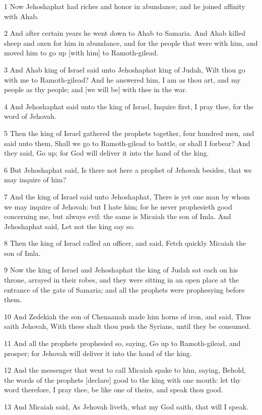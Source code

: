 \par 1 Now Jehoshaphat had riches and honor in abundance; and he joined affinity with Ahab.
\par 2 And after certain years he went down to Ahab to Samaria. And Ahab killed sheep and oxen for him in abundance, and for the people that were with him, and moved him to go up [with him] to Ramoth-gilead.
\par 3 And Ahab king of Israel said unto Jehoshaphat king of Judah, Wilt thou go with me to Ramoth-gilead? And he answered him, I am as thou art, and my people as thy people; and [we will be] with thee in the war.
\par 4 And Jehoshaphat said unto the king of Israel, Inquire first, I pray thee, for the word of Jehovah.
\par 5 Then the king of Israel gathered the prophets together, four hundred men, and said unto them, Shall we go to Ramoth-gilead to battle, or shall I forbear? And they said, Go up; for God will deliver it into the hand of the king.
\par 6 But Jehoshaphat said, Is there not here a prophet of Jehovah besides, that we may inquire of him?
\par 7 And the king of Israel said unto Jehoshaphat, There is yet one man by whom we may inquire of Jehovah: but I hate him; for he never prophesieth good concerning me, but always evil: the same is Micaiah the son of Imla. And Jehoshaphat said, Let not the king say so.
\par 8 Then the king of Israel called an officer, and said, Fetch quickly Micaiah the son of Imla.
\par 9 Now the king of Israel and Jehoshaphat the king of Judah sat each on his throne, arrayed in their robes, and they were sitting in an open place at the entrance of the gate of Samaria; and all the prophets were prophesying before them.
\par 10 And Zedekiah the son of Chenaanah made him horns of iron, and said, Thus saith Jehovah, With these shalt thou push the Syrians, until they be consumed.
\par 11 And all the prophets prophesied so, saying, Go up to Ramoth-gilead, and prosper; for Jehovah will deliver it into the hand of the king.
\par 12 And the messenger that went to call Micaiah spake to him, saying, Behold, the words of the prophets [declare] good to the king with one mouth: let thy word therefore, I pray thee, be like one of theirs, and speak thou good.
\par 13 And Micaiah said, As Jehovah liveth, what my God saith, that will I speak.
